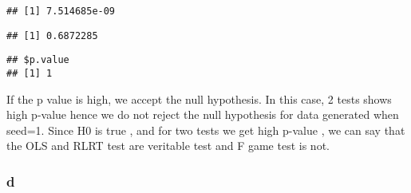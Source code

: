 \documentclass[
]{article}
\newenvironment{Shaded}{\begin{snugshade}}{\end{snugshade}}
\newcommand{\AttributeTok}[1]{\textcolor[rgb]{0.77,0.63,0.00}{#1}}
\newcommand{\DecValTok}[1]{\textcolor[rgb]{0.00,0.00,0.81}{#1}}
\newcommand{\FunctionTok}[1]{\textcolor[rgb]{0.00,0.00,0.00}{#1}}
\newcommand{\NormalTok}[1]{#1}
\newcommand{\OtherTok}[1]{\textcolor[rgb]{0.56,0.35,0.01}{#1}}
\newcommand{\SpecialCharTok}[1]{\textcolor[rgb]{0.00,0.00,0.00}{#1}}
\newcommand{\StringTok}[1]{\textcolor[rgb]{0.31,0.60,0.02}{#1}}
\begin{document}
\begin{verbatim}
## [1] 7.514685e-09
\end{verbatim}

\begin{Shaded}
\end{Shaded}

\begin{verbatim}
## [1] 0.6872285
\end{verbatim}

\begin{Shaded}
\end{Shaded}

\begin{verbatim}
## $p.value
## [1] 1
\end{verbatim}

If the p value is high, we accept the null hypothesis. In this case, 2
tests shows high p-value hence we do not reject the null hypothesis for
data generated when seed=1. Since H0 is true , and for two tests we get
high p-value , we can say that the OLS and RLRT test are veritable test
and F game test is not.

\hypertarget{d}{%
\subsubsection{d}\label{d}}
\end{document}
